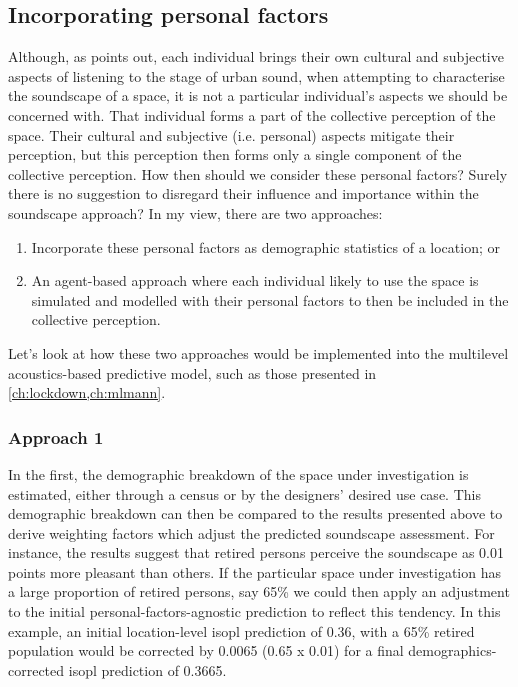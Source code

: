 \subsection{Incorporating personal factors}
Although, as \citet{Droumeva2021sound} points out, each individual brings their own cultural and subjective aspects of listening to the stage of urban sound, when attempting to characterise the soundscape of a space, it is not a particular individual's aspects we should be concerned with. That individual forms a part of the collective perception of the space. Their cultural and subjective (i.e. personal) aspects mitigate their perception, but this perception then forms only a single component of the collective perception. How then should we consider these personal factors? Surely there is no suggestion to disregard their influence and importance within the soundscape approach? In my view, there are two approaches:

\begin{enumerate}
  \item Incorporate these personal factors as demographic statistics of a location; or
  \item An agent-based approach where each individual likely to use the space is simulated and modelled with their personal factors to then be included in the collective perception.
\end{enumerate}

Let's look at how these two approaches would be implemented into the multilevel acoustics-based predictive model, such as those presented in \cref{ch:lockdown,ch:mlmann}.

\subsubsection{Approach 1}
In the first, the demographic breakdown of the space under investigation is estimated, either through a census or by the designers' desired use case. This demographic breakdown can then be compared to the results presented above \citep{Erfanian2021Psychological} to derive weighting factors which adjust the predicted soundscape assessment. For instance, the results suggest that retired persons perceive the soundscape as 0.01 points more pleasant than others. If the particular space under investigation has a large proportion of retired persons, say 65\% we could then apply an adjustment to the initial personal-factors-agnostic prediction to reflect this tendency. In this example, an initial location-level \gls{isopl} prediction of 0.36, with a 65\% retired population would be corrected by 0.0065 (0.65 x 0.01) for a final demographics-corrected \gls{isopl} prediction of 0.3665.

